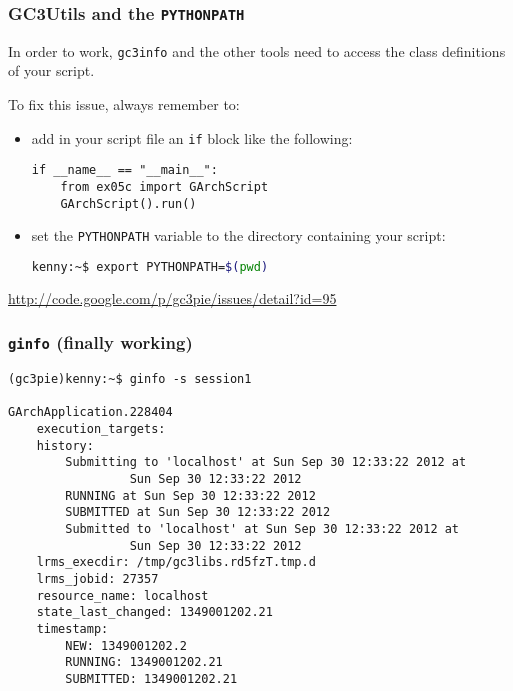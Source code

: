 \documentclass[english,serif,mathserif,xcolor=pdftex,dvipsnames,table]{beamer}
\begin{document}
\begin{frame}[fragile]
  \frametitle{GC3Utils and the \texttt{PYTHONPATH}}

  In order to work, \lstinline|gc3info| and the other tools need to
  access the class definitions of your script.

  \+
  To fix this issue, always remember to:
  \begin{itemize}

  \item add in your script file an \lstinline|if| block like the following:
    \begin{lstlisting}
if __name__ == "__main__":
    from ex05c import GArchScript
    GArchScript().run()
    \end{lstlisting}

  \item set the \lstinline|PYTHONPATH| variable to the directory
    containing your script:
    \begin{lstlisting}[language=sh]
      kenny:~$ export PYTHONPATH=$(pwd)
    \end{lstlisting}%
  \end{itemize}

  \begin{references}
    \url{http://code.google.com/p/gc3pie/issues/detail?id=95}
  \end{references}

\end{frame}

\begin{frame}[fragile]
  \frametitle{\texttt{ginfo} (finally working)}
  \begin{lstlisting}[basicstyle=\tt\scriptsize]
    (gc3pie)kenny:~$ ginfo -s session1

GArchApplication.228404
    execution_targets: 
    history: 
        Submitting to 'localhost' at Sun Sep 30 12:33:22 2012 at 
                 Sun Sep 30 12:33:22 2012
        RUNNING at Sun Sep 30 12:33:22 2012
        SUBMITTED at Sun Sep 30 12:33:22 2012
        Submitted to 'localhost' at Sun Sep 30 12:33:22 2012 at 
                 Sun Sep 30 12:33:22 2012
    lrms_execdir: /tmp/gc3libs.rd5fzT.tmp.d
    lrms_jobid: 27357
    resource_name: localhost
    state_last_changed: 1349001202.21
    timestamp: 
        NEW: 1349001202.2
        RUNNING: 1349001202.21
        SUBMITTED: 1349001202.21
  \end{lstlisting}%
\end{frame}
\end{document}
